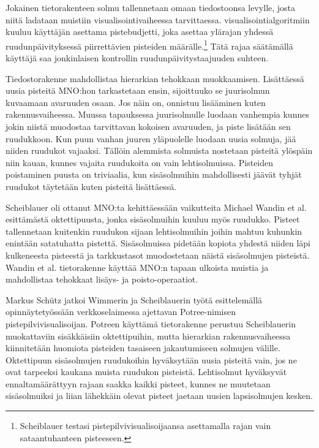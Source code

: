 Jokainen tietorakenteen solmu tallennetaan omaan tiedostoonsa levylle, josta niitä ladataan muistiin visualisointivaiheessa tarvittaessa. visualisointialgoritmiin kuuluu käyttäjän asettama pistebudjetti, joka asettaa ylärajan yhdessä ruudunpäivityksessä piirrettävien pisteiden määrälle.\footnote{Scheiblauer testasi pistepilvivisualisoijaansa asettamalla rajan vain sataantuhanteen pisteeseen.} Tätä rajaa säätämällä käyttäjä saa jonkinlaisen kontrollin ruudunpäivitystaajuuden suhteen. \cite{scheiblauer}

Tiedostorakenne mahdollistaa hierarkian tehokkaan muokkaamisen. Lisättäessä uusia pisteitä MNO:hon tarkastetaan ensin, sijoittuuko se juurisolmun kuvaamaan avaruuden osaan. Jos näin on, onnistuu lisääminen kuten rakennusvaiheessa. Muussa tapauksessa juurisolmulle luodaan vanhempia kunnes jokin niistä muodostaa tarvittavan kokoisen avaruuden, ja piste lisätään sen ruudukkoon. Kun puun vanhan juuren yläpuolelle luodaan uusia solmuja, jää niiden ruudukot vajaaksi. Tällöin alemmista solmuista nostetaan pisteitä ylöspäin niin kauan, kunnes vajaita ruudukoita on vain lehtisolmuissa. Pisteiden poistaminen puusta on triviaalia, kun sisäsolmuihin mahdollisesti jäävät tyhjät ruudukot täytetään kuten pisteitä lisättäessä. \cite{scheiblauer}

Scheiblauer oli ottanut MNO:ta kehittäessään vaikutteita Michael Wandin et al. esittämästä oktettipuusta, jonka sisäsolmuihin kuuluu myös ruudukko. Pisteet tallennetaan kuitenkin ruudukon sijaan lehtisolmuihin joihin mahtuu kuhunkin enintään satatuhatta pistettä. Sisäsolmuissa pidetään kopiota yhdestä niiden läpi kulkeneesta pisteestä ja tarkkustasot muodostetaan näistä sisäsolmujen pisteistä. Wandin et al. tietorakenne käyttää MNO:n tapaan ulkoista muistia ja mahdollistaa tehokkaat lisäys- ja poisto-operaatiot. \cite{wand}

Markus Schütz jatkoi Wimmerin ja Scheiblauerin työtä esittelemällä opinnäytetyössään verkkoselaimessa ajettavan Potree-nimisen pistepilvivisualisoijan. Potreen käyttämä tietorakenne perustuu Scheiblauerin muokattaviin sisäkkäisiin oktettipuihin, mutta hierarkian rakennusvaiheessa kiinnitetään huomiota pisteiden tasaiseen jakautumiseen solmujen välille. Oktettipuun sisäsolmujen ruudukoihin hyväksytään uusia pisteitä vain, jos ne ovat tarpeeksi kaukana muista ruudukon pisteistä. Lehtisolmut hyväksyvät ennaltamäärättyyn rajaan saakka kaikki pisteet, kunnes ne muutetaan sisäsolmuiksi ja liian lähekkäin olevat pisteet jaetaan uusien lapsisolmujen kesken. \cite{potree}


